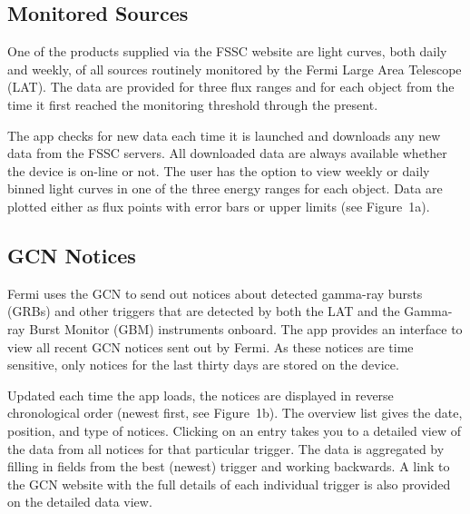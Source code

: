\subsection{Monitored Sources}

One of the products supplied via the FSSC website are light curves, both daily and weekly, of all sources routinely monitored by the Fermi Large Area Telescope (LAT).  The data are provided for three flux ranges and for each object from the time it first reached the monitoring threshold through the present.

The app checks for new data each time it is launched and downloads any new data from the FSSC servers.  All downloaded data are always available whether the device is on-line or not.  The user has the option to view weekly or daily binned light curves in one of the three energy ranges for each object.  Data are plotted either as flux points with error bars or upper limits (see Figure~1a).

\subsection{GCN Notices}
Fermi uses the GCN to send out notices about detected gamma-ray bursts (GRBs) and other triggers that are detected by both the LAT and the Gamma-ray Burst Monitor (GBM) instruments onboard.  The app provides an interface to view all recent GCN notices sent out by Fermi.  As these notices are time sensitive, only notices for the last thirty days are stored on the device.

Updated each time the app loads, the notices are displayed in reverse chronological order (newest first, see Figure~1b).  The overview list gives the date, position, and type of notices.  Clicking on an entry takes you to a detailed view of the data from all notices for that particular trigger.  The data is aggregated by filling in fields from the best (newest) trigger and working backwards.  A link to the GCN website with the full details of each individual trigger is also provided on the detailed data view.

